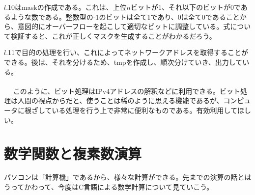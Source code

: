 $l$.10はmaskの作成である。これは、上位$n$ビットが1、それ以下のビットが0であるような数である。整数型の-1のビットは全て1であり、0は全て0であることから、意図的にオーバーフローを起こして適切なビットに調整している。式について検証すると、これが正しくマスクを生成することがわかるだろう。

$l$.11で目的の処理を行い、これによってネットワークアドレスを取得することができる。後は、それを分けるため、tmpを作成し、順次分けていき、出力している。
\\　\\　
このように、ビット処理はIPv4アドレスの解釈などに利用できる。ビット処理は人間の視点からだと、使うことは稀のように思える機能であるが、コンピュータに根ざしている処理を行う上で非常に便利なものである。有効利用してほしい。

\section{数学関数と複素数演算}
パソコンは「計算機」であるから、様々な計算ができる。先までの演算の話とはうってかわって、今度はC言語による数学計算について見ていこう。
